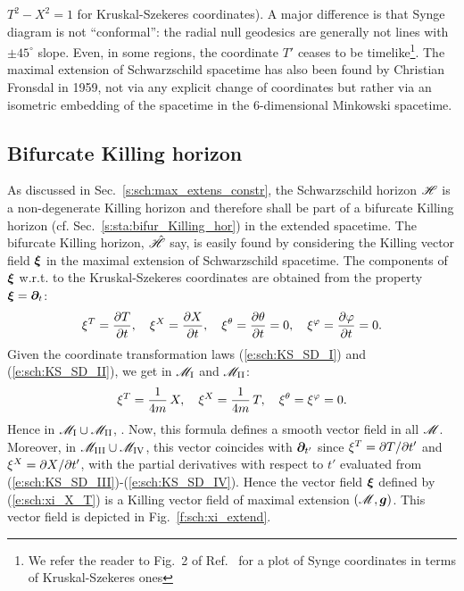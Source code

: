 \begin{hist}
$T^2-X^2 = 1$ for Kruskal-Szekeres coordinates). A major difference is that
Synge diagram is not ``conformal'': the radial null geodesics are generally not
lines with $\pm 45^\circ$ slope. Even, in some regions, the coordinate $T'$
ceases to be timelike\footnote{We refer the reader to Fig.~2 of Ref.~\cite{Unruh14}
for a plot of Synge coordinates in terms of Kruskal-Szekeres ones}.
The maximal extension of Schwarzschild spacetime
has also been found by Christian Fronsdal \cite{Frons59} in 1959, not via any explicit change of coordinates but rather via
an isometric embedding of the spacetime in the 6-dimensional Minkowski spacetime.
\end{hist}


\subsection{Bifurcate Killing horizon} \label{s:max:bifur_Kill_hor}

As discussed in Sec.~\ref{s:sch:max_extens_constr}, the Schwarzschild horizon
$\mathscr{H}$ is
a non-degenerate Killing horizon and therefore shall be part of
a bifurcate Killing horizon (cf. Sec.~\ref{s:sta:bifur_Killing_hor})
in the extended spacetime.
The bifurcate Killing horizon, $\hat{\mathscr{H}}$ say, is easily found by
considering the Killing vector field $\bm{\xi}$ in the maximal extension
of Schwarzschild spacetime. The components of $\bm{\xi}$ w.r.t. to the
Kruskal-Szekeres coordinates are obtained from the
property $\bm{\xi} = \bm{\partial}_t$:
\[
    \xi^T = \frac{\partial T}{\partial t}, \quad
    \xi^X = \frac{\partial X}{\partial t}, \quad
    \xi^\theta = \frac{\partial \theta}{\partial t} = 0, \quad
    \xi^\varphi = \frac{\partial \varphi}{\partial t} = 0 .
\]
Given the coordinate transformation laws (\ref{e:sch:KS_SD_I})
and (\ref{e:sch:KS_SD_II}), we get in
$\mathscr{M}_{\rm I}$ and $\mathscr{M}_{\rm II}$:
\[
    \xi^T = \frac{1}{4m} \, X, \quad
    \xi^X = \frac{1}{4m} \, T , \quad
    \xi^\theta = \xi^\varphi = 0 .
\]
Hence in $\mathscr{M}_{\rm I}\cup\mathscr{M}_{\rm II}$,
\be \label{e:sch:xi_X_T}
    .
\ee
Now, this formula defines a smooth vector field in all $\mathscr{M}$.
Moreover, in $\mathscr{M}_{\rm III}\cup\mathscr{M}_{\rm IV}$, this vector coincides with
$\bm{\partial}_{t'}$ since $\xi^T = {\partial T}/{\partial t'}$ and $\xi^X = {\partial X}/{\partial t'}$,
with the partial derivatives with respect to $t'$ evaluated from
(\ref{e:sch:KS_SD_III})-(\ref{e:sch:KS_SD_IV}). Hence the vector field
$\bm{\xi}$ defined by (\ref{e:sch:xi_X_T}) is a Killing vector field
of maximal extension $(\mathscr{M},\bm{g})$. This vector field is depicted in
Fig.~\ref{f:sch:xi_extend}.

